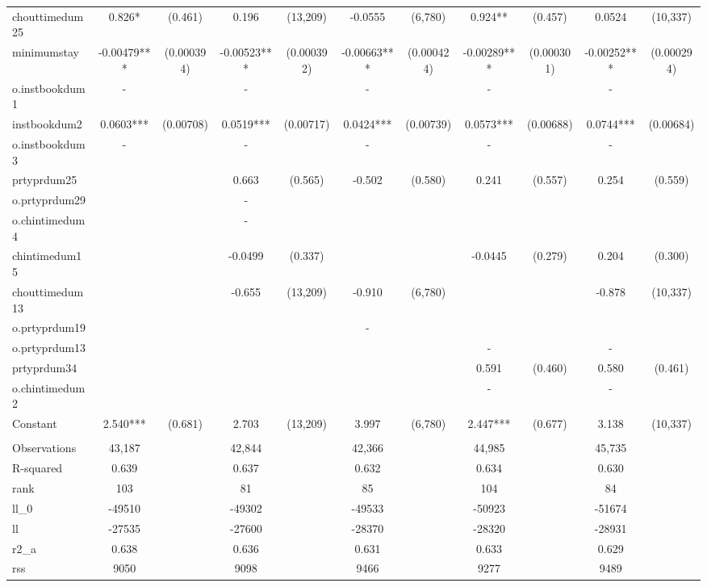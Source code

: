 \documentclass[]{article}
\begin{document}
\begin{tabular}{lcccccccccc}
chouttimedum25 & 0.826* & (0.461) & 0.196 & (13,209) & -0.0555 & (6,780) & 0.924** & (0.457) & 0.0524 & (10,337) \\
minimumstay & -0.00479*** & (0.000394) & -0.00523*** & (0.000392) & -0.00663*** & (0.000424) & -0.00289*** & (0.000301) & -0.00252*** & (0.000294) \\
o.instbookdum1 & - &  & - &  & - &  & - &  & - &  \\
instbookdum2 & 0.0603*** & (0.00708) & 0.0519*** & (0.00717) & 0.0424*** & (0.00739) & 0.0573*** & (0.00688) & 0.0744*** & (0.00684) \\
o.instbookdum3 & - &  & - &  & - &  & - &  & - &  \\
prtyprdum25 &  &  & 0.663 & (0.565) & -0.502 & (0.580) & 0.241 & (0.557) & 0.254 & (0.559) \\
o.prtyprdum29 &  &  & - &  &  &  &  &  &  &  \\
o.chintimedum4 &  &  & - &  &  &  &  &  &  &  \\
chintimedum15 &  &  & -0.0499 & (0.337) &  &  & -0.0445 & (0.279) & 0.204 & (0.300) \\
chouttimedum13 &  &  & -0.655 & (13,209) & -0.910 & (6,780) &  &  & -0.878 & (10,337) \\
o.prtyprdum19 &  &  &  &  & - &  &  &  &  &  \\
o.prtyprdum13 &  &  &  &  &  &  & - &  & - &  \\
prtyprdum34 &  &  &  &  &  &  & 0.591 & (0.460) & 0.580 & (0.461) \\
o.chintimedum2 &  &  &  &  &  &  & - &  & - &  \\
Constant & 2.540*** & (0.681) & 2.703 & (13,209) & 3.997 & (6,780) & 2.447*** & (0.677) & 3.138 & (10,337) \\
 &  &  &  &  &  &  &  &  &  &  \\
Observations & 43,187 &  & 42,844 &  & 42,366 &  & 44,985 &  & 45,735 &  \\
R-squared & 0.639 &  & 0.637 &  & 0.632 &  & 0.634 &  & 0.630 &  \\
rank & 103 &  & 81 &  & 85 &  & 104 &  & 84 &  \\
ll\_0 & -49510 &  & -49302 &  & -49533 &  & -50923 &  & -51674 &  \\
ll & -27535 &  & -27600 &  & -28370 &  & -28320 &  & -28931 &  \\
r2\_a & 0.638 &  & 0.636 &  & 0.631 &  & 0.633 &  & 0.629 &  \\
rss & 9050 &  & 9098 &  & 9466 &  & 9277 &  & 9489 &  \\

\end{tabular}
\end{document}
